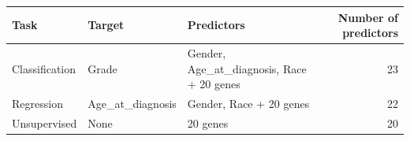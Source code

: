 \begin{tabular}{llp{6cm}r}
\toprule
\textbf{Task} & \textbf{Target} & \textbf{Predictors} & \textbf{Number of predictors} \\
\midrule
Classification & Grade & Gender, Age\_at\_diagnosis, Race + 20 genes & 23 \\
Regression & Age\_at\_diagnosis & Gender, Race + 20 genes & 22 \\
Unsupervised & None & 20 genes & 20 \\
\bottomrule
\end{tabular}
